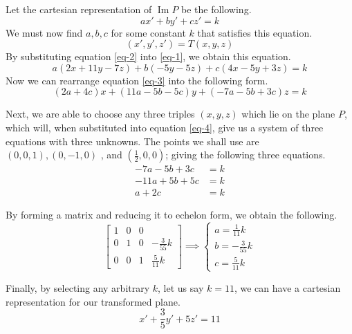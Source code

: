\documentclass{article}
\newenvironment{answers}{ %
	\begin{enumerate}
		\setlength{\itemsep}{\bigskipamount}
}{\end{enumerate}}
\newcommand{\img}{\operatorname{Im}}
\begin{document}
\begin{answers}
\begin{enumerate}
				Let the cartesian representation of \(\img P\) be the following.
				\begin{equation}
					ax'+by'+cz'=k \label{eq-1}
				\end{equation}
				We must now find \(a, b, c\) for some constant \(k\) that satisfies this equation.
				\begin{equation}
					(x', y', z') = T(x,y,z) \label{eq-2}
				\end{equation}
				By substituting equation \ref{eq-2} into \ref{eq-1}, we obtain this equation.
				\begin{equation}
					a(2x + 11y - 7z)+b(-5y - 5z)+c(4x - 5y + 3z)=k \label{eq-3}
				\end{equation}
				Now we can rearrange equation \ref{eq-3} into the following form.
				\begin{equation}
					(2a+4c)x+(11a-5b-5c)y+(-7a-5b+3c)z=k \label{eq-4}
				\end{equation}

				Next, we are able to choose any three triples \((x, y, z)\) which lie on the plane \(P\), which will, when substituted into equation \ref{eq-4}, give us a system of three equations with three unknowns. The points we shall use are \((0,0,1), (0, -1, 0)\) , and \((\frac{1}{2}, 0, 0)\); giving the following three equations.
				\begin{align*}
					-7a-5b+3c  & =k \\
					-11a+5b+5c & =k \\
					a+2c       & =k
				\end{align*}

				By forming a matrix and reducing it to echelon form, we obtain the following.
				\begin{equation*}
					\left[ \begin{matrix}
							1 & 0 & 0 &                \\[6pt]
							0 & 1 & 0 & -\frac{3}{55}k \\[6pt]
							0 & 0 & 1 & \frac{5}{11}k
						\end{matrix} \right]
					\implies
					\begin{cases}
						a= \frac{1}{11} k \\
						b= -\frac{3}{55}k \\
						c= \frac{5}{11}k
					\end{cases}
				\end{equation*}

				Finally, by selecting any arbitrary \(k\), let us say \(k=11\), we can have a cartesian representation for our transformed plane.
				\begin{equation*}
					x'+\frac{3}{5}y'+5z'=11
				\end{equation*}


\end{enumerate}
\end{answers}
\end{document}
